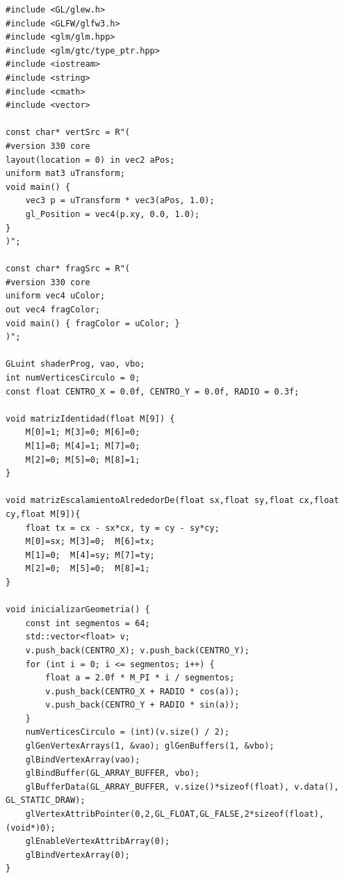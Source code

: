 \documentclass[12pt,a4paper]{article}
\begin{document}
\begin{lstlisting}[caption={actividadCirculo.cpp}]
#include <GL/glew.h>
#include <GLFW/glfw3.h>
#include <glm/glm.hpp>
#include <glm/gtc/type_ptr.hpp>
#include <iostream>
#include <string>
#include <cmath>
#include <vector>

const char* vertSrc = R"(
#version 330 core
layout(location = 0) in vec2 aPos;
uniform mat3 uTransform;
void main() {
    vec3 p = uTransform * vec3(aPos, 1.0);
    gl_Position = vec4(p.xy, 0.0, 1.0);
}
)";

const char* fragSrc = R"(
#version 330 core
uniform vec4 uColor;
out vec4 fragColor;
void main() { fragColor = uColor; }
)";

GLuint shaderProg, vao, vbo;
int numVerticesCirculo = 0;
const float CENTRO_X = 0.0f, CENTRO_Y = 0.0f, RADIO = 0.3f;

void matrizIdentidad(float M[9]) {
    M[0]=1; M[3]=0; M[6]=0;
    M[1]=0; M[4]=1; M[7]=0;
    M[2]=0; M[5]=0; M[8]=1;
}

void matrizEscalamientoAlrededorDe(float sx,float sy,float cx,float cy,float M[9]){
    float tx = cx - sx*cx, ty = cy - sy*cy;
    M[0]=sx; M[3]=0;  M[6]=tx;
    M[1]=0;  M[4]=sy; M[7]=ty;
    M[2]=0;  M[5]=0;  M[8]=1;
}

void inicializarGeometria() {
    const int segmentos = 64;
    std::vector<float> v;
    v.push_back(CENTRO_X); v.push_back(CENTRO_Y);
    for (int i = 0; i <= segmentos; i++) {
        float a = 2.0f * M_PI * i / segmentos;
        v.push_back(CENTRO_X + RADIO * cos(a));
        v.push_back(CENTRO_Y + RADIO * sin(a));
    }
    numVerticesCirculo = (int)(v.size() / 2);
    glGenVertexArrays(1, &vao); glGenBuffers(1, &vbo);
    glBindVertexArray(vao);
    glBindBuffer(GL_ARRAY_BUFFER, vbo);
    glBufferData(GL_ARRAY_BUFFER, v.size()*sizeof(float), v.data(), GL_STATIC_DRAW);
    glVertexAttribPointer(0,2,GL_FLOAT,GL_FALSE,2*sizeof(float),(void*)0);
    glEnableVertexAttribArray(0);
    glBindVertexArray(0);
}


\end{lstlisting}
\end{document}

